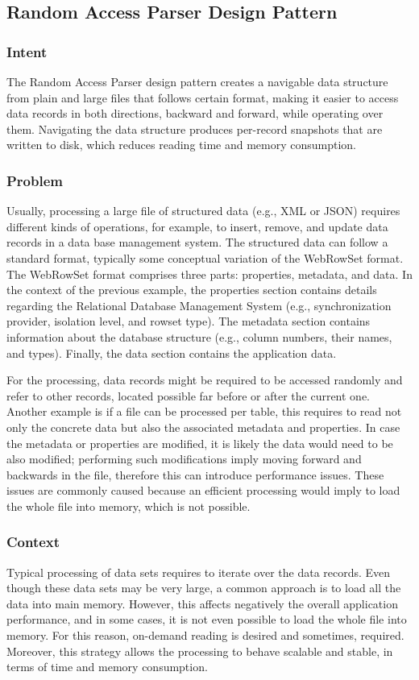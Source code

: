 
\subsection{Random Access Parser Design Pattern}

\subsubsection{Intent}
The Random Access Parser design pattern creates a navigable data structure from plain and large files that follows certain format, making it easier to access data records in both directions, backward and forward, while operating over them. Navigating the data structure produces per-record snapshots that are written to disk, which reduces reading time and memory consumption.

\subsubsection{Problem}
Usually, processing a large file of structured data (e.g., XML or JSON) requires different kinds of operations, for example, to insert, remove, and update data records in a data base management system. The structured data can follow a standard format, typically some conceptual variation of the WebRowSet format. The WebRowSet format comprises three parts: properties, metadata, and data. In the context of the previous example, the properties section contains details regarding the Relational Database Management System (e.g., synchronization provider, isolation level, and rowset type). The metadata section contains information about the database structure (e.g., column numbers, their names, and types). Finally, the data section contains the application data.

For the processing, data records might be required to be accessed randomly and refer to other records, located possible far before or after the current one. Another example is if a file can be processed per table, this requires to read not only the concrete data but also the associated metadata and properties. In case the metadata or properties are modified, it is likely the data would need to be also modified; performing such modifications imply moving forward and backwards in the file, therefore this can introduce performance issues. These issues are commonly caused because an efficient processing would imply to load the whole file into memory, which is not possible.

\subsubsection{Context}
Typical processing of data sets requires to iterate over the data records. Even though these data sets may be very large, a common approach is to load all the data into main memory. However, this affects negatively the overall application performance, and in some cases, it is not even possible to load the whole file into memory. For this reason, on-demand reading is desired and sometimes, required. Moreover, this strategy allows the processing to behave scalable and stable, in terms of time and memory consumption.

